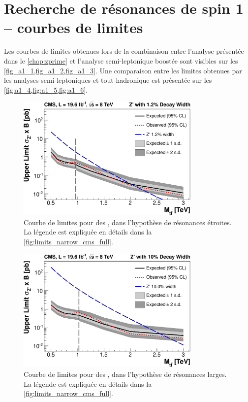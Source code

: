 \chapter{Recherche de résonances de spin 1 -- courbes de limites}

Les courbes de limites obtenues lors de la combinaison entre l'analyse présentée dans le \cref{chap:zprime} et l'analyse semi-leptonique boostée sont visibles sur les \cref{fig_a1_1,fig_a1_2,fig_a1_3}. Une comparaison entre les limites obtenues par les analyses semi-leptoniques et tout-hadronique est présentée sur les \cref{fig:a1_4,fig:a1_5,fig:a1_6}.

\begin{figure}[tb]
    \centering
    \includegraphics[width=0.8\textwidth]{chapitre7/figs/limits-narrow.pdf}
    \caption{Courbe de limites pour des \zprime, dans l'hypothèse de résonances étroites. La légende est expliquée en détails dans la \cref{fig:limits_narrow_cms_full}.}
    \label{fig_a1_1}
\end{figure}

\begin{figure}[tb]
    \centering
    \includegraphics[width=0.8\textwidth]{chapitre7/figs/limits-wide.pdf}
    \caption{Courbe de limites pour des \zprime, dans l'hypothèse de résonances larges. La légende est expliquée en détails dans la \cref{fig:limits_narrow_cms_full}.}
    \label{fig_a1_2}
\end{figure}

